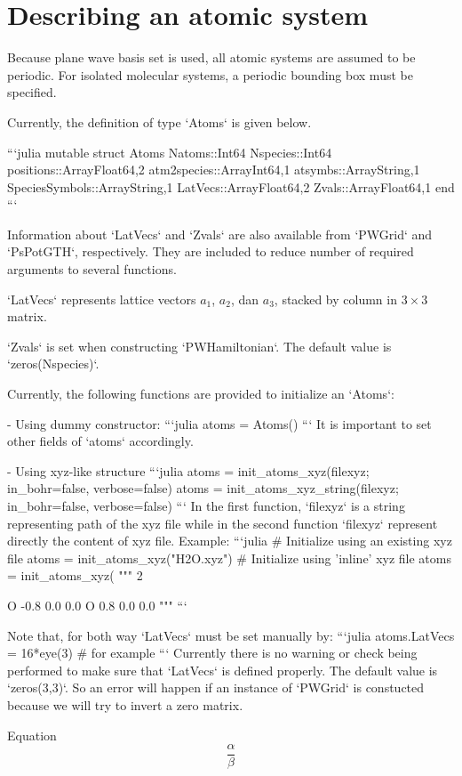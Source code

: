 \section{Describing an atomic system}

\begin{markdown}
Because plane wave basis set is used, all atomic systems are assumed
to be periodic. For isolated molecular systems, a periodic bounding box
must be specified.

Currently, the definition of type `Atoms` is given below.

```julia
mutable struct Atoms
    Natoms::Int64
    Nspecies::Int64
    positions::Array{Float64,2}
    atm2species::Array{Int64,1}
    atsymbs::Array{String,1}
    SpeciesSymbols::Array{String,1}
    LatVecs::Array{Float64,2}
    Zvals::Array{Float64,1}
end
```

Information about `LatVecs` and `Zvals` are also available
from `PWGrid` and `PsPotGTH`, respectively.
They are included to reduce number of required arguments to several functions.

`LatVecs` represents lattice vectors $a_{1}$, $a_{2}$, dan $a_{3}$, stacked by column
in $3\times3$ matrix.

`Zvals` is set when constructing `PWHamiltonian`. The default value is `zeros(Nspecies)`.

Currently, the following functions are provided to initialize an `Atoms`:

- Using dummy constructor:
  ```julia
  atoms = Atoms()
  ```
  It is important to set other fields of `atoms` accordingly.

- Using xyz-like structure
  ```julia
  atoms = init_atoms_xyz(filexyz; in_bohr=false, verbose=false)
  atoms = init_atoms_xyz_string(filexyz; in_bohr=false, verbose=false)
  ```
  In the first function, `filexyz` is a string representing path of the xyz file while
  in the second function `filexyz` represent directly the content of xyz file.
  Example:
  ```julia
  # Initialize using an existing xyz file
  atoms = init_atoms_xyz("H2O.xyz")
  # Initialize using 'inline' xyz file
  atoms = init_atoms_xyz(
  """
  2

  O   -0.8  0.0  0.0
  O    0.8  0.0  0.0
  """
  ```

Note that, for both way `LatVecs` must be set manually by:
```julia
atoms.LatVecs = 16*eye(3) # for example
```
Currently there is no warning or check being performed to make sure that `LatVecs`
is defined properly. The default value is `zeros(3,3)`. So an error will happen
if an instance of `PWGrid` is constucted because we will try to invert a zero matrix.


Equation
\begin{equation}
\frac{\alpha}{\beta}
\end{equation}


\end{markdown}
